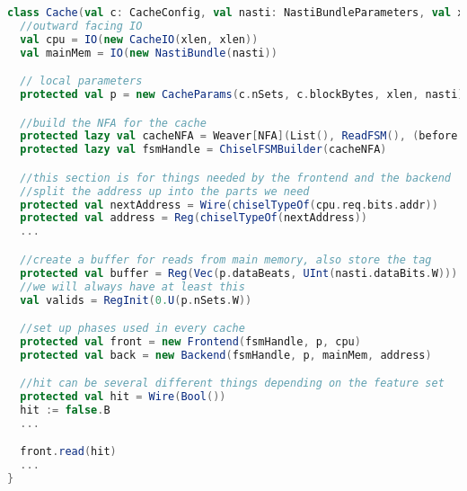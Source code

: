 \begin{lstlisting}[language = Scala]
class Cache(val c: CacheConfig, val nasti: NastiBundleParameters, val xlen: Int) extends Module {
  //outward facing IO
  val cpu = IO(new CacheIO(xlen, xlen))
  val mainMem = IO(new NastiBundle(nasti))

  // local parameters
  protected val p = new CacheParams(c.nSets, c.blockBytes, xlen, nasti)

  //build the NFA for the cache
  protected lazy val cacheNFA = Weaver[NFA](List(), ReadFSM(), (before: NFA, after: NFA) => before.isEqual(after))
  protected lazy val fsmHandle = ChiselFSMBuilder(cacheNFA)

  //this section is for things needed by the frontend and the backend
  //split the address up into the parts we need
  protected val nextAddress = Wire(chiselTypeOf(cpu.req.bits.addr))
  protected val address = Reg(chiselTypeOf(nextAddress))
  ...

  //create a buffer for reads from main memory, also store the tag
  protected val buffer = Reg(Vec(p.dataBeats, UInt(nasti.dataBits.W)))
  //we will always have at least this
  val valids = RegInit(0.U(p.nSets.W))

  //set up phases used in every cache
  protected val front = new Frontend(fsmHandle, p, cpu)
  protected val back = new Backend(fsmHandle, p, mainMem, address)

  //hit can be several different things depending on the feature set
  protected val hit = Wire(Bool())
  hit := false.B
  ...

  front.read(hit)
  ...
}
\end{lstlisting}